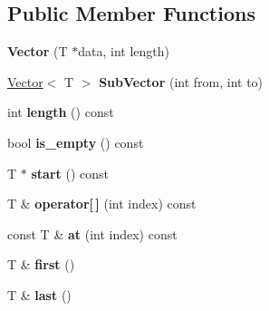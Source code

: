 \subsection*{Public Member Functions}
\begin{DoxyCompactItemize}
\item 
\hypertarget{classv8_1_1internal_1_1_vector_ab47ce496195ef09e6e7fe8d9770d8833}{}{\bfseries Vector} (T $\ast$data, int length)\label{classv8_1_1internal_1_1_vector_ab47ce496195ef09e6e7fe8d9770d8833}

\item 
\hypertarget{classv8_1_1internal_1_1_vector_a44a2e5352bc702d3b06fab45bab93be2}{}\hyperlink{classv8_1_1internal_1_1_vector}{Vector}$<$ T $>$ {\bfseries Sub\+Vector} (int from, int to)\label{classv8_1_1internal_1_1_vector_a44a2e5352bc702d3b06fab45bab93be2}

\item 
\hypertarget{classv8_1_1internal_1_1_vector_a445fffd2824071aed691ef4486c100d1}{}int {\bfseries length} () const \label{classv8_1_1internal_1_1_vector_a445fffd2824071aed691ef4486c100d1}

\item 
\hypertarget{classv8_1_1internal_1_1_vector_ac54ecbed441a0cae8e6c585c305fd96e}{}bool {\bfseries is\+\_\+empty} () const \label{classv8_1_1internal_1_1_vector_ac54ecbed441a0cae8e6c585c305fd96e}

\item 
\hypertarget{classv8_1_1internal_1_1_vector_a7b6e8d56f87dad2de500125b16ff607b}{}T $\ast$ {\bfseries start} () const \label{classv8_1_1internal_1_1_vector_a7b6e8d56f87dad2de500125b16ff607b}

\item 
\hypertarget{classv8_1_1internal_1_1_vector_ab8edc8d98f6111850fbc8120f055acc3}{}T \& {\bfseries operator\mbox{[}$\,$\mbox{]}} (int index) const \label{classv8_1_1internal_1_1_vector_ab8edc8d98f6111850fbc8120f055acc3}

\item 
\hypertarget{classv8_1_1internal_1_1_vector_a8a136b2239755e011fb8214cd0972eda}{}const T \& {\bfseries at} (int index) const \label{classv8_1_1internal_1_1_vector_a8a136b2239755e011fb8214cd0972eda}

\item 
\hypertarget{classv8_1_1internal_1_1_vector_a13e9fef6a9a3f72da9b4c93d21e089ab}{}T \& {\bfseries first} ()\label{classv8_1_1internal_1_1_vector_a13e9fef6a9a3f72da9b4c93d21e089ab}

\item 
\hypertarget{classv8_1_1internal_1_1_vector_a5e900c0bafc9fe198955b4013cbf90dc}{}T \& {\bfseries last} ()\label{classv8_1_1internal_1_1_vector_a5e900c0bafc9fe198955b4013cbf90dc}


\end{DoxyCompactItemize}
